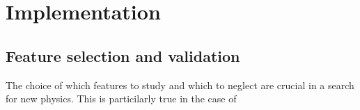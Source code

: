 \chapter{Implementation}\label{chap:Implementation}
\section{Feature selection and validation}
The choice of which features to study and which to neglect are crucial in a search for new physics. This is particilarly true 
in the case of 
